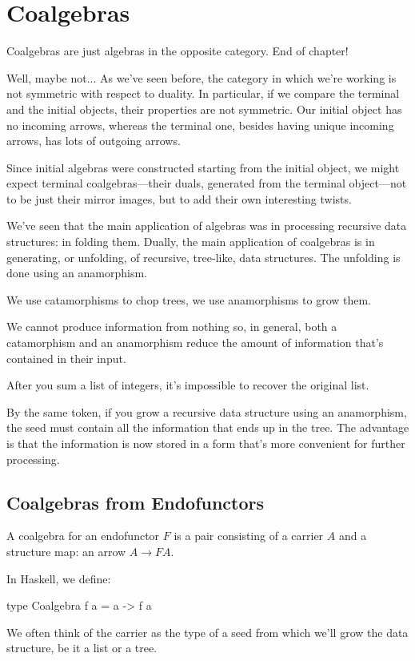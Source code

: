 \documentclass[DaoFP]{subfiles}
\begin{document}
\setcounter{chapter}{11}

\chapter{Coalgebras}

Coalgebras are just algebras in the opposite category. End of chapter!

Well, maybe not... As we've seen before, the category in which we're working is not symmetric with respect to duality. In particular, if we compare the terminal and the initial objects, their properties are not symmetric. Our initial object has no incoming arrows, whereas the terminal one, besides having unique incoming arrows, has lots of outgoing arrows. 

Since initial algebras were constructed starting from the initial object, we might expect terminal coalgebras---their duals, generated from the terminal object---not to be just their mirror images, but to add their own interesting twists.

We've seen that the main application of algebras was in processing recursive data structures: in folding them. Dually, the main application of coalgebras is in generating, or unfolding, of recursive, tree-like, data structures. The unfolding is done using an anamorphism.

We use catamorphisms to chop trees, we use anamorphisms to grow them. 

We cannot produce information from nothing so, in general, both a catamorphism and an anamorphism reduce the amount of information that's contained in their input. 

After you sum a list of integers, it's impossible to recover the original list. 

By the same token, if you grow a recursive data structure using an anamorphism, the seed must contain all the information that ends up in the tree. The advantage is that the information is now stored in a form that's more convenient for further processing.

\section{Coalgebras from Endofunctors}

A coalgebra for an endofunctor $F$ is a pair consisting of a carrier $A$ and a structure map: an arrow $A \to F A$. 

In Haskell, we define:
\begin{haskell}
 type Coalgebra f a = a -> f a
\end{haskell}
We often think of the carrier as the type of a seed from which we'll grow the data structure, be it a list or a tree. 
\end{document}
